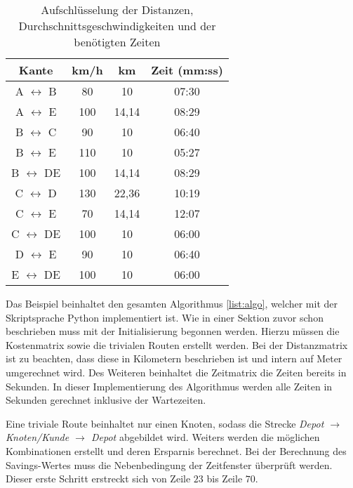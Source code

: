 \begin{table}[htb]%
\centering%
\begin{tabular}{c|c|c|c}
Kante & km/h & km & Zeit (mm:ss) \\ 
\hline 
A $\leftrightarrow$ B & 80 & 10 & 07:30 \\ 
A $\leftrightarrow$ E & 100 & 14,14 & 08:29 \\ 
B $\leftrightarrow$ C & 90 & 10 & 06:40 \\ 
B $\leftrightarrow$ E & 110 & 10 & 05:27 \\ 
B $\leftrightarrow$ DE & 100 & 14,14 & 08:29 \\ 
C $\leftrightarrow$ D & 130 & 22,36 & 10:19 \\ 
C $\leftrightarrow$ E & 70 & 14,14 & 12:07 \\ 
C $\leftrightarrow$ DE & 100 & 10 & 06:00 \\ 
D $\leftrightarrow$ E & 90 & 10 & 06:40 \\ 
E $\leftrightarrow$ DE & 100 & 10 & 06:00 \\ 
\end{tabular} 
\caption{Aufschlüsselung der Distanzen, Durchschnittsgeschwindigkeiten und der benötigten Zeiten}
\label{tab:edgeValues}
\end{table}
Das Beispiel beinhaltet den gesamten Algorithmus \ref{list:algo}, welcher mit der Skriptsprache Python implementiert ist. 
Wie in einer Sektion zuvor schon beschrieben muss mit der Initialisierung begonnen werden. 
Hierzu müssen die Kostenmatrix sowie die trivialen Routen erstellt werden. 
Bei der Distanzmatrix ist zu beachten, dass diese in Kilometern beschrieben ist und intern auf Meter umgerechnet wird. 
Des Weiteren beinhaltet die Zeitmatrix die Zeiten bereits in Sekunden. 
In dieser Implementierung des Algorithmus werden alle Zeiten in Sekunden gerechnet inklusive der Wartezeiten. 

\noindent
Eine triviale Route beinhaltet nur einen Knoten, sodass die Strecke \textit{Depot $\rightarrow$ Knoten/Kunde $\rightarrow$ Depot} abgebildet wird. 
Weiters werden die möglichen Kombinationen erstellt und deren Ersparnis berechnet. 
Bei der Berechnung des Savings-Wertes muss die Nebenbedingung der Zeitfenster überprüft werden. 
Dieser erste Schritt erstreckt sich von Zeile $23$ bis Zeile $70$. 

